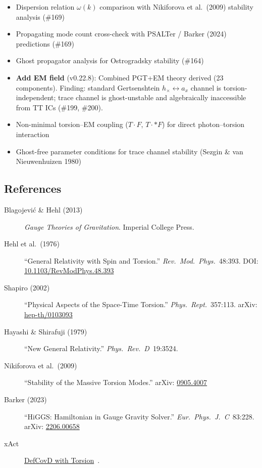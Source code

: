 \begin{itemize}
  \item Dispersion relation $\omega(k)$ comparison with Nikiforova et al.\ (2009) stability analysis (\#169)
  \item Propagating mode count cross-check with PSALTer / Barker (2024) predictions (\#169)
  \item Ghost propagator analysis for Ostrogradsky stability (\#164)
  \item[{[DONE]}] \textbf{Add EM field} (v0.22.8): Combined PGT+EM theory derived (23 components).
    Finding: standard Gertsenshtein $h_\times \leftrightarrow a_x$ channel is torsion-independent;
    trace channel is ghost-unstable and algebraically inaccessible from TT ICs (\#199, \#200).
  \item Non-minimal torsion--EM coupling ($T{\cdot}F$, $T{\cdot}{*F}$) for direct photon--torsion interaction
  \item Ghost-free parameter conditions for trace channel stability (Sezgin \& van Nieuwenhuizen 1980)
\end{itemize}

\subsection{References}
\label{sec:torsion-references}

\begin{description}
  \item[Blagojevi\'c \& Hehl (2013)] \emph{Gauge Theories of Gravitation}. Imperial College Press.
  \item[Hehl et al.\ (1976)] ``General Relativity with Spin and Torsion.'' \emph{Rev.\ Mod.\ Phys.}\ 48:393. DOI: \href{https://doi.org/10.1103/RevModPhys.48.393}{10.1103/RevModPhys.48.393}
  \item[Shapiro (2002)~\cite{shapiro2002torsion}] ``Physical Aspects of the Space-Time Torsion.'' \emph{Phys.\ Rept.}\ 357:113. arXiv: \href{https://arxiv.org/abs/hep-th/0103093}{hep-th/0103093}
  \item[Hayashi \& Shirafuji (1979)] ``New General Relativity.'' \emph{Phys.\ Rev.\ D}\ 19:3524.
  \item[Nikiforova et al.\ (2009)] ``Stability of the Massive Torsion Modes.'' arXiv: \href{https://arxiv.org/abs/0905.4007}{0905.4007}
  \item[Barker (2023)~\cite{barker2024poincare}] ``HiGGS: Hamiltonian in Gauge Gravity Solver.'' \emph{Eur.\ Phys.\ J.\ C}\ 83:228. arXiv: \href{https://arxiv.org/abs/2206.00658}{2206.00658}
  \item[xAct] \href{http://www.xact.es/Documentation/HTML/HTMLLinks/xTensor/DefCovD.nb.html}{DefCovD with Torsion}~\cite{martingarcia2007xact}.
\end{description}
